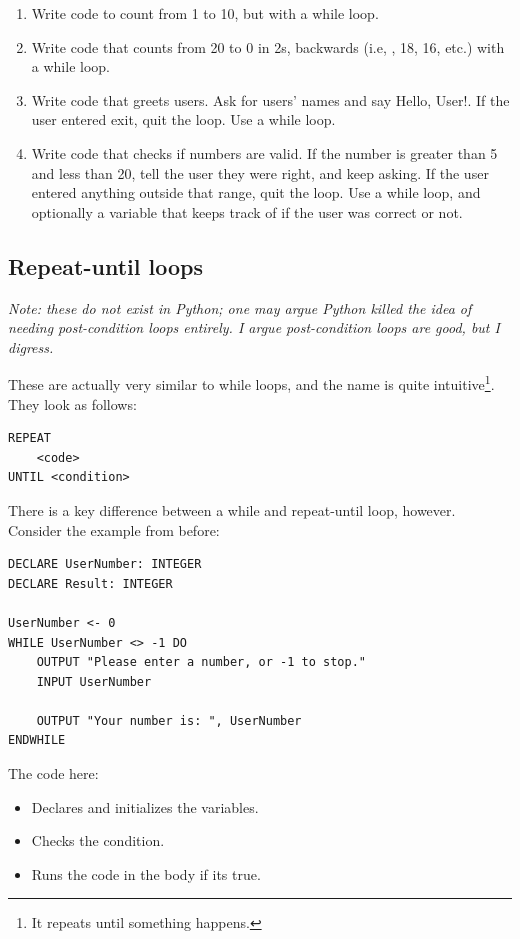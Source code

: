 \documentclass[./main.tex]{subfiles}
\begin{document}
\begin{enumerate}
    \item Write code to count from 1 to 10, but with a while loop.
        \mediumlines
    \item Write code that counts from 20 to 0 in 2s, backwards (i.e, {, 18, 16}, etc.) with a while loop.
        \mediumlines
    \item Write code that greets users. Ask for users' names and say {\ccmono Hello, User!}. If the user entered {\ccmono exit}, quit the loop. Use a while loop.
        \largelines
    \item Write code that checks if numbers are valid. If the number is greater than 5 and less than 20, tell the user they were right, and keep asking. If the user entered anything outside that range, quit the loop. Use a while loop, and optionally a variable that keeps track of if the user was correct or not.
        \largelines
\end{enumerate}

\newpage
\subsection{Repeat-until loops}

\emph{Note: these do not exist in Python; one may argue Python killed the idea of needing post-condition loops entirely. I argue post-condition loops are good, but I digress.}

These are actually very similar to while loops, and the name is quite intuitive\footnote{It repeats until something happens.}. They look as follows:

\begin{verbatim}
REPEAT
    <code>
UNTIL <condition>
\end{verbatim}

There is a key difference between a while and repeat-until loop, however. Consider the example from before:

\begin{verbatim}
DECLARE UserNumber: INTEGER
DECLARE Result: INTEGER

UserNumber <- 0
WHILE UserNumber <> -1 DO 
    OUTPUT "Please enter a number, or -1 to stop."
    INPUT UserNumber

    OUTPUT "Your number is: ", UserNumber
ENDWHILE
\end{verbatim}

The code here:

\begin{itemize}
    \item Declares and initializes the variables.
    \item Checks the condition.
    \item Runs the code in the body if its true.
\end{itemize}
\end{document}
